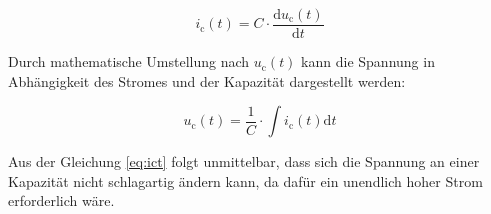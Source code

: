 {	\begin{equation}
		i_\mathrm{c}(t) = C \cdot \frac{\mathrm{d}u_\mathrm{c}(t)}{\mathrm{d}t} \label{eq:ict}
	\end{equation}

	Durch mathematische Umstellung nach $u_\mathrm{c}(t)$ kann die Spannung in Abhängigkeit des Stromes und der Kapazität dargestellt werden:

	\begin{equation}
		u_\mathrm{c}(t) = \frac{1}{C} \cdot \int i_\mathrm{c}(t) \mathrm{d}t \label{eq:uci}
	\end{equation}

	Aus der Gleichung \ref{eq:ict} folgt unmittelbar, dass sich die Spannung an einer Kapazität nicht schlagartig ändern kann,
	da dafür ein unendlich hoher Strom erforderlich wäre.

}
